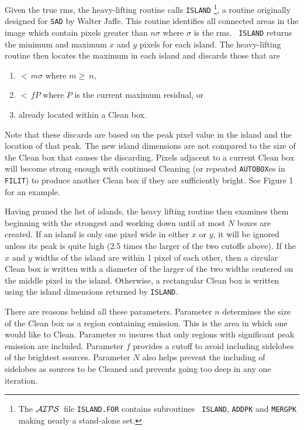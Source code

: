 \documentclass[twoside]{article}
\newcommand{\AIPS}{{$\cal AIPS\/$}}
\begin{document}
Given the true rms, the heavy-lifting routine calls {\tt ISLAND}%
\footnote{The \AIPS\ file {\tt ISLAND.FOR} contains subroutines {\tt
 ISLAND}, {\tt ADDPK} and {\tt MERGPK} making nearly a stand-alone
  set.}, a routine originally designed for {\tt SAD} by Walter Jaffe.
This routine identifies all connected areas in the image which contain
pixels greater than $n \sigma$ where $\sigma$ is the rms.  {\tt
  ISLAND} returns the minimum and maximum $x$ and $y$ pixels for each
island.  The heavy-lifting routine then locates the maximum in each
island and discards those that are
\begin{enumerate}
\item\hspace{2 em} $ <\, m \sigma$ where $m \geq\ n$,
\item\hspace{2 em} $ <\, f P$ where $P$ is the current maximum
                   residual, or
\item\hspace{2 em} already located within a Clean box.
\end{enumerate}
Note that these discards are based on the peak pixel value in the
island and the location of that peak.  The new island dimensions are
not compared to the size of the Clean box that causes the discarding.
Pixels adjacent to a current Clean box will become strong enough with
continued Cleaning (or repeated {\tt AUTOBOX}es in {\tt FILIT}) to
produce another Clean box if they are sufficiently bright.  See Figure
1 for an example.

Having pruned the list of islands, the heavy lifting routine then
examines them beginning with the strongest and working down until
at most $N$ boxes are created.  If an island is only one pixel wide in
either $x$ or $y$, it will be ignored unless its peak is quite high
(2.5 times the larger of the two cutoffs above).  If the $x$ and $y$
widths of the island are within 1 pixel of each other, then a
circular Clean box is written with a diameter of the larger of the two
widths centered on the middle pixel in the island.  Otherwise, a
rectangular Clean box is written using the island dimensions returned
by {\tt ISLAND}\@.

There are reasons behind all these parameters.  Parameter $n$
determines the size of the Clean box as a region containing emission.
This is the area in which one would like to Clean.  Parameter $m$
insures that only regions with significant peak emission are included.
Parameter $f$ provides a cutoff to avoid including sidelobes of the
brightest sources.  Parameter $N$ also helps prevent the including
of sidelobes as sources to be Cleaned and prevents going too deep in
any one iteration.
\end{document}
